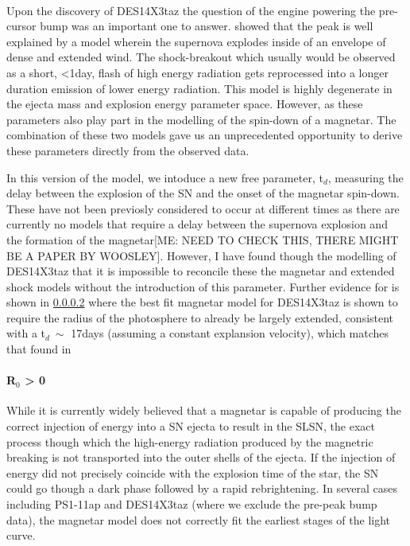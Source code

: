 \paragraph{\citet{Piro2015}}
Upon the discovery of DES14X3taz the question of the engine powering the pre-cursor bump was an important one to answer. \citet{Smith2016} showed that the peak is well explained by a model wherein the supernova explodes inside of an envelope of dense and extended wind. The shock-breakout which usually would be observed as a short, <1day, flash of high energy radiation gets reprocessed into a longer duration emission of lower energy radiation. This model is highly degenerate in the ejecta mass and explosion energy parameter space. However, as these parameters also play part in the modelling of the spin-down of a magnetar. The combination of these two models gave us an unprecedented opportunity to derive these parameters directly from the observed data.

In this version of the model, we intoduce a new free parameter, t$_d$, measuring the delay between the explosion of the SN and the onset of the magnetar spin-down. These have not been previosly considered to occur at different times \citep{Nicolls} as there are currently no models that require a delay between the supernova explosion and the formation of the magnetar[ME: NEED TO CHECK THIS, THERE MIGHT BE A PAPER BY WOOSLEY]. However, I have found though the modelling of DES14X3taz that it is impossible to reconcile these the magnetar and extended shock models without the introduction of this parameter. Further evidence for is shown in \cref{par:R0nonzero} where the best fit magnetar model for DES14X3taz is shown to require the radius of the photosphere to already be largely extended, consistent with a t$_d ~\sim$ 17days (assuming a constant explansion velocity), which matches that found in \citet{Smith2016}

\paragraph{R$_0$ > 0}
\label{par:R0nonzero}
While it is currently widely believed that a magnetar is capable of producing the correct injection of energy into a SN ejecta to result in the SLSN, the exact process though which the high-energy radiation produced by the magnetric breaking is not transported into the outer shells of the ejecta. If the injection of energy did not precisely coincide with the explosion time of the star, the SN could go though a dark phase followed by a rapid rebrightening. In several cases including PS1-11ap and DES14X3taz (where we exclude the pre-peak bump data), the magnetar model does not correctly fit the earliest stages of the light curve.

